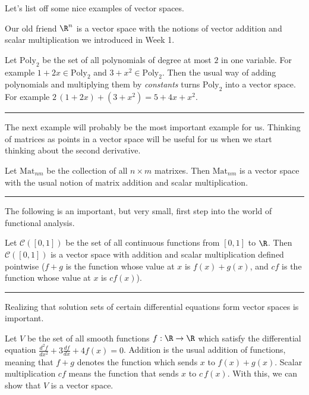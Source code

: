 \documentclass{ximera}
\begin{document}
Let's list off some nice examples of vector spaces.

\begin{example}
  Our old friend $\R^n$ is a vector space with the notions of vector addition and scalar multiplication we introduced in Week 1.
\end{example}

\begin{example}
  Let $\text{Poly}_2$ be the set of all polynomials of degree at most $2$ in one variable.  For example $1+2x \in \text{Poly}_2$ and $3+x^2 \in \text{Poly}_2$.  Then the usual way of 
  adding polynomials and multiplying them by \textit{constants} turns $\text{Poly}_2$ into a vector space.  For example $2 \, (1+2x)+(3+x^2)  = 5+4x+x^2$.
\end{example}

\hrule

The next example will probably be the most important example for us.  Thinking of matrices as points in a vector space will be useful for us when we 
start thinking about the second derivative.
	
\begin{example}
  Let $\text{Mat}_{nm}$ be the collection of all $n \times m$ matrixes.  Then $\text{Mat}_{nm}$ is a vector space with the usual notion of matrix addition and scalar multiplication.
\end{example}

\hrule
	
The following is an important, but very small, first step into the world of functional analysis.
	
\begin{example}
  Let $\mathcal{C}([0,1])$ be the set of all continuous functions from $[0,1]$ to $\R$.  Then $\mathcal{C}([0,1])$ is a vector space with addition and scalar 
  multiplication defined pointwise ($f+g$ is the function whose value at $x$ is $f(x)+g(x)$, and $cf$ is the function whose value at $x$ is $cf(x)$).
\end{example}

\hrule
	
Realizing that solution sets of certain differential equations form vector spaces is important.

Let $V$ be the set of all smooth functions $f: \R \to \R$ which
satisfy the differential equation $\frac{d^2f}{dx^2} + 3\frac{df}{dx}
+4f(x) = 0$.  Addition is the usual addition of functions, meaning
that $f + g$ denotes the function which sends $x$ to $f(x) + g(x)$.
Scalar multiplication $cf$ means the function that sends $x$ to
$c\,f(x)$.  With this, we can show that $V$ is a vector space.
		
\end{document}
